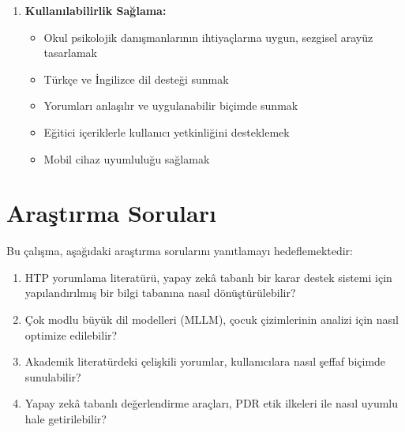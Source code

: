 \begin{enumerate}
  \item \textbf{Kullanılabilirlik Sağlama:}
  \begin{itemize}
    \item Okul psikolojik danışmanlarının ihtiyaçlarına uygun, sezgisel arayüz tasarlamak
    \item Türkçe ve İngilizce dil desteği sunmak
    \item Yorumları anlaşılır ve uygulanabilir biçimde sunmak
    \item Eğitici içeriklerle kullanıcı yetkinliğini desteklemek
    \item Mobil cihaz uyumluluğu sağlamak
  \end{itemize}
\end{enumerate}

\section{Araştırma Soruları}

Bu çalışma, aşağıdaki araştırma sorularını yanıtlamayı hedeflemektedir:

\begin{enumerate}
  \item HTP yorumlama literatürü, yapay zekâ tabanlı bir karar destek sistemi için yapılandırılmış bir bilgi tabanına nasıl dönüştürülebilir?
  \item Çok modlu büyük dil modelleri (MLLM), çocuk çizimlerinin analizi için nasıl optimize edilebilir?
  \item Akademik literatürdeki çelişkili yorumlar, kullanıcılara nasıl şeffaf biçimde sunulabilir?
  \item Yapay zekâ tabanlı değerlendirme araçları, PDR etik ilkeleri ile nasıl uyumlu hale getirilebilir?
\end{enumerate}

\newpage

